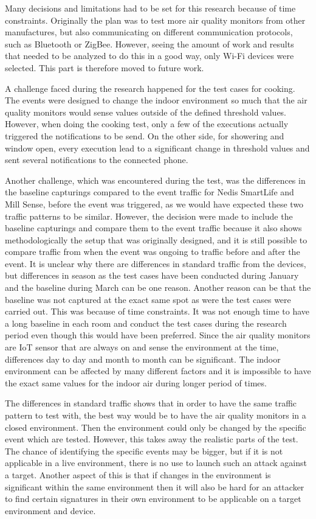 Many decisions and limitations had to be set for this research because of time constraints. Originally the plan was to test more air quality monitors from other manufactures, but also communicating on different communication protocols, such as Bluetooth or ZigBee. However, seeing the amount of work and results that needed to be analyzed to do this in a good way, only \gls{Wi-Fi} devices were selected. This part is therefore moved to future work.  

A challenge faced during the research happened for the test cases for cooking. The events were designed to change the indoor environment so much that the air quality monitors would sense values outside of the defined threshold values. However, when doing the cooking test, only a few of the executions actually triggered the notifications to be send. On the other side, for showering and window open, every execution lead to a significant change in threshold values and sent several notifications to the connected phone. 

Another challenge, which was encountered during the test, was the differences in the baseline capturings compared to the event traffic for Nedis SmartLife and Mill Sense, before the event was triggered, as we would have expected these two traffic patterns to be similar. However, the decision were made to include the baseline capturings and compare them to the event traffic because it also shows methodologically the setup that was originally designed, and it is still possible to compare traffic from when the event was ongoing to traffic before and after the event. It is unclear why there are differences in standard traffic from the devices, but differences in season as the test cases have been conducted during January and the baseline during March can be one reason. Another reason can be that the baseline was not captured at the exact same spot as were the test cases were carried out. This was because of time constraints. It was not enough time to have a long baseline in each room and conduct the test cases during the research period even though this would have been preferred. Since the air quality monitors are \gls{IoT} sensor that are always on and sense the environment at the time, differences day to day and month to month can be significant. The indoor environment can be affected by many different factors and it is impossible to have the exact same values for the indoor air during longer period of times. 

The differences in standard traffic shows that in order to have the same traffic pattern to test with, the best way would be to have the air quality monitors in a closed environment. Then the environment could only be changed by the specific event which are tested. However, this takes away the realistic parts of the test. The chance of identifying the specific events may be bigger, but if it is not applicable in a live environment, there is no use to launch such an attack against a target. Another aspect of this is that if changes in the environment is significant within the same environment then it will also be hard for an attacker to find certain signatures in their own environment to be applicable on a target environment and device. 